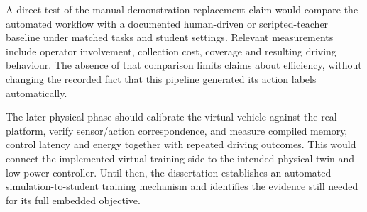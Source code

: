 A direct test of the manual-demonstration replacement claim would compare the
automated workflow with a documented human-driven or scripted-teacher baseline
under matched tasks and student settings. Relevant measurements include
operator involvement, collection cost, coverage and resulting driving behaviour.
The absence of that comparison limits claims about efficiency, without changing
the recorded fact that this pipeline generated its action labels automatically.

The later physical phase should calibrate the virtual vehicle against the real
platform, verify sensor/action correspondence, and measure compiled memory,
control latency and energy together with repeated driving outcomes. This would
connect the implemented virtual training side to the intended physical twin and
low-power controller. Until then, the dissertation establishes an automated
simulation-to-student training mechanism and identifies the evidence still
needed for its full embedded objective.
